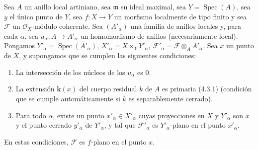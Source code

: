 \begin{proposition}[11.4.11]
\label{IV.11.4.11}
Sea $A$ un anillo local artiniano, sea $\mathfrak m$ su ideal maximal,
sea $Y=\operatorname{Spec}(A)$, sea $y$ el único punto de $Y$, sea $f:X\to Y$ un morfismo localmente de tipo finito y sea $\mathcal F$ un
$\mathcal O_X$-módulo coherente. Sea $(A'_\alpha)$ una familia de anillos locales y, para cada $\alpha$, sea $u_\alpha:A\to A'_\alpha$
un homomorfismo de anillos (necesariamente local). Pongamos $Y'_\alpha=\operatorname{Spec}(A'_\alpha)$, $X'_\alpha=X\times_Y Y'_\alpha$,
$\mathcal F'_\alpha=\mathcal F\otimes_A A'_\alpha$. Sea $x$ un punto
de $X$, y supongamos que se cumplen las siguientes condiciones:
\begin{enumerate}[label=\textup{(\roman*)}]
  \item La intersección de los núcleos de los $u_\alpha$ es $0$.
  \item La extensión $\boldsymbol{k}(x)$ del cuerpo residual $k$ de $A$ es primaria \textup{(4.3.1)} (condición que se cumple automáticamente
  si $k$ es separablemente cerrado).
\end{enumerate}
\begin{enumerate}[label=\textup{(\roman*)}]
  \setcounter{enumi}{2}
  \item Para todo $\alpha$, existe un punto $x'_\alpha\in X'_\alpha$ cuyas proyecciones en $X$ y $Y'_\alpha$
  son $x$ y el punto cerrado $y'_\alpha$ de $Y'_\alpha$, y tal que $\mathcal F'_\alpha$ es $Y'_\alpha$-plano en el punto $x'_\alpha$.
\end{enumerate}

En estas condiciones, $\mathcal F$ es $f$-plano en el punto $x$.
\end{proposition}

